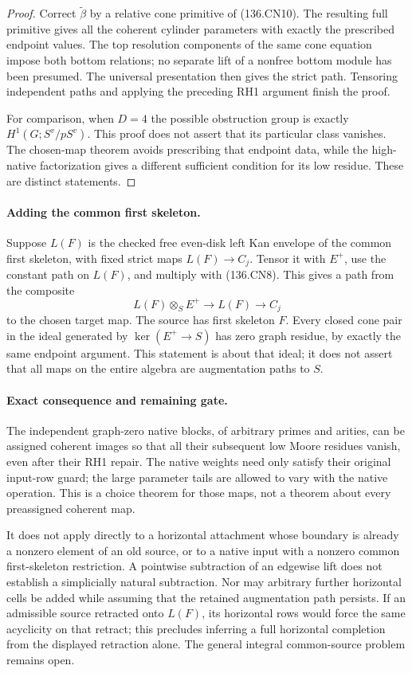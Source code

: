 \begin{proof}
Correct \(\widetilde\beta\) by a relative cone primitive
of (136.CN10).  The resulting full primitive gives all the
coherent cylinder parameters with exactly the prescribed
endpoint values.  The top resolution components of the same
cone equation impose both bottom relations; no separate lift
of a nonfree bottom module has been presumed.  The universal
presentation then gives the strict path.  Tensoring independent
paths and applying the preceding RH1 argument finish the proof.

For comparison, when \(D=4\) the possible obstruction group
is exactly \(H^1(G;S^v/pS^v)\).  This proof does not assert
that its particular class vanishes.  The chosen-map theorem
avoids prescribing that endpoint data, while the high-native
factorization gives a different sufficient condition for its
low residue.  These are distinct statements.
\end{proof}

\paragraph{Adding the common first skeleton.}
Suppose \(L(F)\) is the checked free even-disk left Kan
envelope of the common first skeleton, with fixed strict maps
\(L(F)\to C_j\).  Tensor it with \(E^+\), use the
constant path on \(L(F)\), and multiply with (136.CN8).
This gives a path from the composite
\[
 L(F)\otimes_S E^+\longrightarrow L(F)\longrightarrow C_j
\]
to the chosen target map.  The source has first skeleton \(F\).
Every closed cone pair in the ideal generated by
\(\ker(E^+\to S)\) has zero graph residue, by exactly
the same endpoint argument.  This statement is about that
ideal; it does not assert that all maps on the entire algebra
are augmentation paths to \(S\).

\paragraph{Exact consequence and remaining gate.}
The independent graph-zero native blocks, of arbitrary primes
and arities, can be assigned coherent images so that all their
subsequent low Moore residues vanish, even after their RH1
repair.  The native weights need only satisfy their original
input-row guard; the large parameter tails are allowed to vary
with the native operation.  This is a choice theorem for those
maps, not a theorem about every preassigned coherent map.

It does not apply directly to a horizontal attachment whose
boundary is already a nonzero element of an old source, or to
a native input with a nonzero common first-skeleton restriction.
A pointwise subtraction of an edgewise lift does not establish
a simplicially natural subtraction.  Nor may arbitrary further
horizontal cells be added while assuming that the retained
augmentation path persists.  If an admissible source retracted
onto \(L(F)\), its horizontal rows would force the same
acyclicity on that retract; this precludes inferring a full
horizontal completion from the displayed retraction alone.
The general integral common-source problem remains open.

